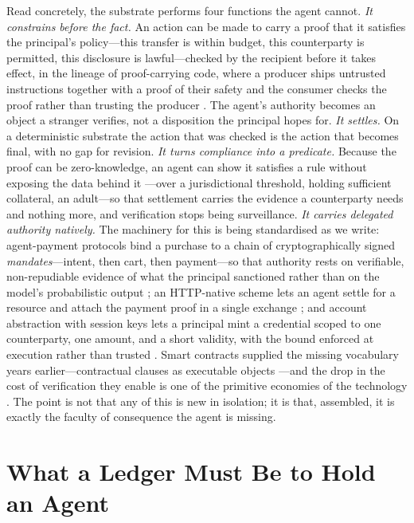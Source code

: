 \documentclass[11pt]{article}
\begin{document}
Read concretely, the substrate performs four functions the agent cannot.
\emph{It constrains before the fact.} An action can be made to carry a
proof that it satisfies the principal's policy---this transfer is within
budget, this counterparty is permitted, this disclosure is
lawful---checked by the recipient before it takes effect, in the lineage
of proof-carrying code, where a producer ships untrusted instructions
together with a proof of their safety and the consumer checks the proof
rather than trusting the producer \citep{necula1997pcc}. The
agent's authority becomes an object a stranger verifies, not a
disposition the principal hopes for. \emph{It settles.} On a
deterministic substrate the action that was checked is the action that
becomes final, with no gap for revision. \emph{It turns compliance into a
predicate.} Because the proof can be zero-knowledge, an agent can show it
satisfies a rule without exposing the data behind it
\citep{goldwasser1989knowledge,bensasson2014zerocash}---over a
jurisdictional threshold, holding sufficient collateral, an adult---so
that settlement carries the evidence a counterparty needs and nothing
more, and verification stops being surveillance. \emph{It carries
delegated authority natively.} The machinery for this is being
standardised as we write: agent-payment protocols bind a purchase to a
chain of cryptographically signed \emph{mandates}---intent, then cart,
then payment---so that authority rests on verifiable, non-repudiable
evidence of what the principal sanctioned rather than on the model's
probabilistic output \citep{ap2google2025}; an HTTP-native scheme lets an
agent settle for a resource and attach the payment proof in a single
exchange \citep{x402coinbase2025}; and account abstraction with session
keys lets a principal mint a credential scoped to one counterparty, one
amount, and a short validity, with the bound enforced at execution rather
than trusted \citep{erc4337}. Smart contracts supplied the missing
vocabulary years earlier---contractual clauses as executable objects
\citep{szabo1997formalizing}---and the drop in the cost of verification
they enable is one of the primitive economies of the technology
\citep{catalini2020simple}. The point is not that any of this is new in
isolation; it is that, assembled, it is exactly the faculty of
consequence the agent is missing.

\section{What a Ledger Must Be to Hold an Agent}
\label{sec:requirements}
\end{document}
